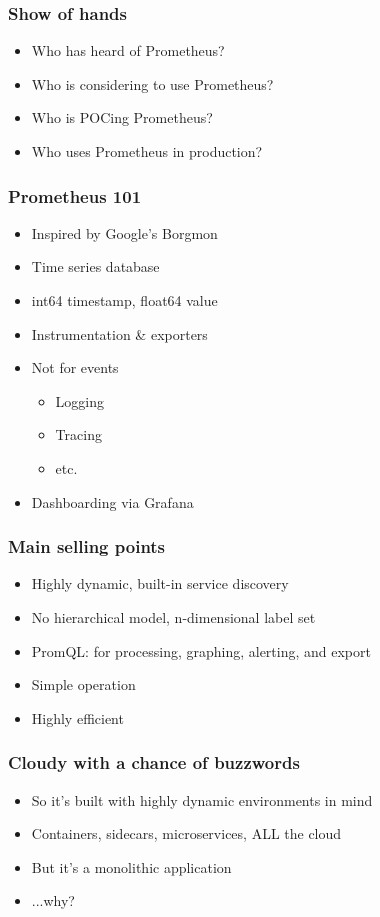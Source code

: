 \documentclass[t]{beamer}
\begin{document}



\begin{frame}
	\frametitle{Show of hands}
	\begin{itemize}
		\item Who has heard of Prometheus?
		\item Who is considering to use Prometheus?
		\item Who is POCing Prometheus?
		\item Who uses Prometheus in production?
	\end{itemize}
\end{frame}

\begin{frame}
	\frametitle{Prometheus 101}
	\begin{itemize}
		\item Inspired by Google's Borgmon
		\item Time series database
		\item int64 timestamp, float64 value
		\item Instrumentation \& exporters
		\item Not for events
		\begin{itemize}
			\item Logging
			\item Tracing
			\item etc.
		\end{itemize}
		\item Dashboarding via Grafana
	\end{itemize}
\end{frame}

\begin{frame}
	\frametitle{Main selling points}
	\begin{itemize}
		\item Highly dynamic, built-in service discovery
		\item No hierarchical model, n-dimensional label set
		\item PromQL: for processing, graphing, alerting, and export
		\item Simple operation
		\item Highly efficient
	\end{itemize}
\end{frame}

\begin{frame}
	\frametitle{Cloudy with a chance of buzzwords}
	\begin{itemize}
		\item So it's built with highly dynamic environments in mind
		\item Containers, sidecars, microservices, ALL the cloud
		\item But it's a monolithic application
		\vfill
		\item ...why?
	\end{itemize}
\end{frame}
\end{document}

